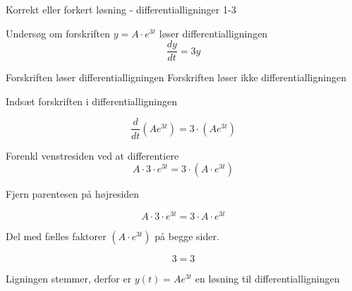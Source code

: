 \documentclass{article}
\begin{document}
\begin{exercise}{Korrekt eller forkert løsning - differentialligninger 1-3}


Undersøg om forskriften $y = A \cdot e^{3t}$ løser differentialligningen
\[
\frac{dy}{dt} = 3y
\]


\begin{multichoice}
\itemtrue Forskriften løser differentialligningen
\itemfalse Forskriften løser ikke differentialligningen
\end{multichoice}

\hint

Indsæt forskriften i differentialligningen

\hint
\[
\frac{d}{dt} \left( A e^{3t}\right) = 3 \cdot \left( A e^{3t} \right)
\]


\hint

Forenkl venstresiden ved at differentiere
\[
A \cdot 3 \cdot e^{3t} = 3 \cdot \left(A \cdot e^{3t} \right)
\]

\hint

Fjern parentesen på højresiden

\hint
\[
A \cdot 3 \cdot e^{3t} = 3 \cdot A \cdot e^{3t}
\]

\hint
Del med fælles faktorer $\left( A \cdot e^{3t} \right)$ på begge sider.

\hint

\[
3 = 3
\]


\hint

Ligningen stemmer, derfor er $y(t) = A e^{3t}$ en løsning til differentialligningen

\end{exercise}

\newpage
\end{document}
